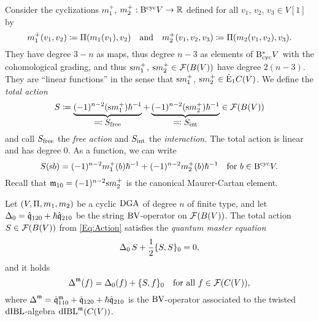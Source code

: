 \documentclass[\MainFolder/Text.tex]{subfiles}
\begin{document}
Consider the cyclizations $m^+_1$, $m^+_2: \mathrm{B}^{\mathrm{cyc}} V \rightarrow \mathbb{R}$ defined for all $v_1$, $v_2$, $v_3 \in V[1]$ by
$$ m_1^+(v_1,v_2)\coloneqq \Pi(m_1(v_1),v_2)\quad\text{and}\quad m^+_2(v_1,v_2,v_3)\coloneqq \Pi(m_2(v_1,v_2),v_3). $$
They have degree $3-n$ as maps, thus degree $n-3$ as elements of $\mathrm{B}_{\mathrm{cyc}}^* V$ with the cohomological grading, and thus $\mathrm{s} m^+_1$, $\mathrm{s} m^+_2\in \mathcal{F}(B(V))$ have degree $2(n-3)$.
They are ``linear functions'' in the sense that $\mathrm{s} m^+_1$, $\mathrm{s} m^+_2 \in \hat{\mathrm{E}}_1C(V)$.
We define the \emph{total action}
\begin{equation}\label{Eq:Action}
 S \coloneqq \underbrace{(-1)^{n-2}(\mathrm{s} m_1^+)\hbar^{-1}}_{\displaystyle\eqqcolon S_{\mathrm{free}}} + \underbrace{(-1)^{n-2}(\mathrm{s} m_2^+)\hbar^{-1}}_{\displaystyle \eqqcolon S_{\mathrm{int}}}\in \mathcal{F}(B(V))
\end{equation}
and call $S_{\mathrm{free}}$ the \emph{free action} and $S_{\mathrm{int}}$ the \emph{interaction.} The total action is linear and has degree $0$.
As a function, we can write 
$$ S(\mathrm{s} b) = (-1)^{n-2}m_1^+(b) \hbar^{-1} + (-1)^{n-2} m_2^+(b) \hbar^{-1}\quad\text{for }b\in \mathrm{B}^{\mathrm{cyc}} V.$$
Recall that $\mathfrak{m}_{10} = (-1)^{n-2}\mathrm{s} m_2^+$ is the canonical Maurer-Cartan element.

\begin{Proposition}\label{Prop:BVActForCanMC}
Let $(V,\Pi,m_1,m_2)$ be a cyclic $\mathrm{DGA}$ of degree $n$ of finite type, and let $\operatorname{\Delta}_0 = \hat{\mathfrak{q}}_{120} + \hbar \hat{\mathfrak{q}}_{210}$ be the string $\mathrm{BV}$-operator on $\mathcal{F}(B(V))$.
The total action $S\in \mathcal{F}(B(V))$ from \eqref{Eq:Action} satisfies the \emph{quantum master equation} 
\begin{equation}\label{Eq:QME}
 \operatorname{\Delta}_0 S + \frac{1}{2}\{S,S\}_0 = 0,
\end{equation}
and it holds
\begin{equation}\label{Eq:Twist}
 \operatorname{\Delta}^{\mathfrak{m}}(f)= \operatorname{\Delta}_0(f) + \{S,f\}_0\quad\text{for all }f\in \mathcal{F}(C(V)),
\end{equation}
where $\operatorname{\Delta}^{\mathfrak{m}} = \hat{\mathfrak{q}}_{110}^{\mathfrak{m}} + \hat{\mathfrak{q}}_{120} + \hbar \hat{\mathfrak{q}}_{210}$ is the $\mathrm{BV}$-operator associated to the twisted $\mathrm{dIBL}$-algebra $\mathrm{dIBL}^{\mathfrak{m}}(C(V))$.
\end{Proposition}
\end{document}
